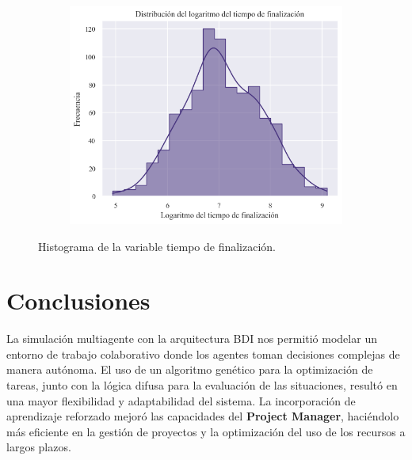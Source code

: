 \documentclass[a4paper, 12pt]{article}
\begin{document}
\begin{figure}[htb!]
\begin{subfigure}{.45\linewidth}
			\includegraphics[height=.95\linewidth, width=.95\linewidth]{assets/log_time_dist}
			\caption{}
			\label{fig:1b}
		\end{subfigure}
		\caption{Histograma de la variable tiempo de finalización.}
		\label{fig:1}
	\end{figure}

\section{Conclusiones}
La simulación multiagente con la arquitectura BDI nos permitió modelar un entorno de trabajo colaborativo donde los agentes toman decisiones complejas de manera autónoma. El uso de un algoritmo genético para la optimización de tareas, junto con la lógica difusa para la evaluación de las situaciones, resultó en una mayor flexibilidad y adaptabilidad del sistema. La incorporación de aprendizaje reforzado mejoró las capacidades del \textbf{Project Manager}, haciéndolo más eficiente en la gestión de proyectos y la optimización del uso de los recursos a largos plazos.
\end{document}

